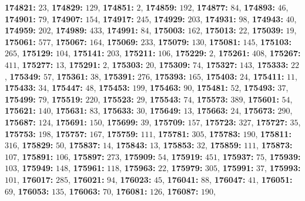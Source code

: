 \textsf{\bfseries 174821:} $23$, \textsf{\bfseries 174829:} $129$, \textsf{\bfseries 174851:} $2$, \textsf{\bfseries 174859:} $192$, \textsf{\bfseries 174877:} $84$, \textsf{\bfseries 174893:} $46$, \textsf{\bfseries 174901:} $79$, \textsf{\bfseries 174907:} $154$, \textsf{\bfseries 174917:} $245$, \textsf{\bfseries 174929:} $203$, \textsf{\bfseries 174931:} $98$, \textsf{\bfseries 174943:} $40$, \textsf{\bfseries 174959:} $202$, \textsf{\bfseries 174989:} $433$, \textsf{\bfseries 174991:} $84$, \textsf{\bfseries 175003:} $162$, \textsf{\bfseries 175013:} $22$, \textsf{\bfseries 175039:} $19$, \textsf{\bfseries 175061:} $577$, \textsf{\bfseries 175067:} $164$, \textsf{\bfseries 175069:} $233$, \textsf{\bfseries 175079:} $130$, \textsf{\bfseries 175081:} $145$, \textsf{\bfseries 175103:} $265$, \textsf{\bfseries 175129:} $104$, \textsf{\bfseries 175141:} $203$, \textsf{\bfseries 175211:} $106$, \textsf{\bfseries 175229:} $2$, \textsf{\bfseries 175261:} $408$, \textsf{\bfseries 175267:} $411$, \textsf{\bfseries 175277:} $13$, \textsf{\bfseries 175291:} $2$, \textsf{\bfseries 175303:} $20$, \textsf{\bfseries 175309:} $74$, \textsf{\bfseries 175327:} $143$, \textsf{\bfseries 175333:} $22$, \textsf{\bfseries 175349:} $57$, \textsf{\bfseries 175361:} $38$, \textsf{\bfseries 175391:} $276$, \textsf{\bfseries 175393:} $165$, \textsf{\bfseries 175403:} $24$, \textsf{\bfseries 175411:} $11$, \textsf{\bfseries 175433:} $34$, \textsf{\bfseries 175447:} $48$, \textsf{\bfseries 175453:} $199$, \textsf{\bfseries 175463:} $90$, \textsf{\bfseries 175481:} $52$, \textsf{\bfseries 175493:} $37$, \textsf{\bfseries 175499:} $79$, \textsf{\bfseries 175519:} $220$, \textsf{\bfseries 175523:} $29$, \textsf{\bfseries 175543:} $74$, \textsf{\bfseries 175573:} $389$, \textsf{\bfseries 175601:} $54$, \textsf{\bfseries 175621:} $140$, \textsf{\bfseries 175631:} $83$, \textsf{\bfseries 175633:} $30$, \textsf{\bfseries 175649:} $13$, \textsf{\bfseries 175663:} $24$, \textsf{\bfseries 175673:} $290$, \textsf{\bfseries 175687:} $124$, \textsf{\bfseries 175691:} $150$, \textsf{\bfseries 175699:} $39$, \textsf{\bfseries 175709:} $157$, \textsf{\bfseries 175723:} $327$, \textsf{\bfseries 175727:} $35$, \textsf{\bfseries 175753:} $198$, \textsf{\bfseries 175757:} $167$, \textsf{\bfseries 175759:} $111$, \textsf{\bfseries 175781:} $305$, \textsf{\bfseries 175783:} $190$, \textsf{\bfseries 175811:} $316$, \textsf{\bfseries 175829:} $50$, \textsf{\bfseries 175837:} $14$, \textsf{\bfseries 175843:} $13$, \textsf{\bfseries 175853:} $32$, \textsf{\bfseries 175859:} $111$, \textsf{\bfseries 175873:} $107$, \textsf{\bfseries 175891:} $106$, \textsf{\bfseries 175897:} $273$, \textsf{\bfseries 175909:} $54$, \textsf{\bfseries 175919:} $451$, \textsf{\bfseries 175937:} $75$, \textsf{\bfseries 175939:} $103$, \textsf{\bfseries 175949:} $148$, \textsf{\bfseries 175961:} $118$, \textsf{\bfseries 175963:} $22$, \textsf{\bfseries 175979:} $305$, \textsf{\bfseries 175991:} $37$, \textsf{\bfseries 175993:} $101$, \textsf{\bfseries 176017:} $285$, \textsf{\bfseries 176021:} $94$, \textsf{\bfseries 176023:} $45$, \textsf{\bfseries 176041:} $88$, \textsf{\bfseries 176047:} $41$, \textsf{\bfseries 176051:} $69$, \textsf{\bfseries 176053:} $135$, \textsf{\bfseries 176063:} $70$, \textsf{\bfseries 176081:} $126$, \textsf{\bfseries 176087:} $190$, 
